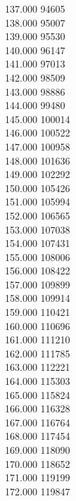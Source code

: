 { 137.000	94605 \\
 138.000	95007 \\
 139.000	95530 \\
 140.000	96147 \\
 141.000	97013 \\
 142.000	98509 \\
 143.000	98886 \\
 144.000	99480 \\
 145.000	100014 \\
 146.000	100522 \\
 147.000	100958 \\
 148.000	101636 \\
 149.000	102292 \\
 150.000	105426 \\
 151.000	105994 \\
 152.000	106565 \\
 153.000	107038 \\
 154.000	107431 \\
 155.000	108006 \\
 156.000	108422 \\
 157.000	109899 \\
 158.000	109914 \\
 159.000	110421 \\
 160.000	110696 \\
 161.000	111210 \\
 162.000	111785 \\
 163.000	112221 \\
 164.000	115303 \\
 165.000	115824 \\
 166.000	116328 \\
 167.000	116764 \\
 168.000	117454 \\
 169.000	118090 \\
 170.000	118652 \\
 171.000	119199 \\
 172.000	119847 \\
}
